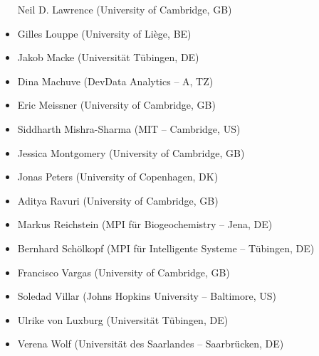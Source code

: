 \begin{itemize}
    Neil D. Lawrence (University of Cambridge, GB)
    \item
    Gilles Louppe (University of Liège, BE)
    \item
    Jakob Macke (Universität Tübingen, DE)
    \item
    Dina Machuve (DevData Analytics -- A, TZ)
    \item
    Eric Meissner (University of Cambridge, GB)
    \item
    Siddharth Mishra-Sharma (MIT -- Cambridge, US)
    \item
    Jessica Montgomery (University of Cambridge, GB)
    \item
    Jonas Peters (University of Copenhagen, DK)
    \item
    Aditya Ravuri (University of Cambridge, GB)
    \item
    Markus Reichstein (MPI für Biogeochemistry -- Jena, DE)
    \item
    Bernhard Schölkopf (MPI für Intelligente Systeme -- Tübingen, DE)
    \item
    Francisco Vargas (University of Cambridge, GB)
    \item
    Soledad Villar (Johns Hopkins University -- Baltimore, US)
    \item
    Ulrike von Luxburg (Universität Tübingen, DE)
    \item
    Verena Wolf (Universität des Saarlandes -- Saarbrücken, DE)

\end{itemize}